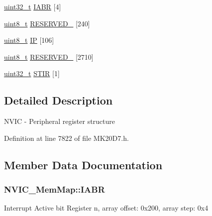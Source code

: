 \begin{DoxyCompactItemize}
\item 
\hyperlink{_p_e___types_8h_a33594304e786b158f3fb30289278f5af}{uint32\+\_\+t} \hyperlink{struct_n_v_i_c___mem_map_ab1d202f955863778a0b6bfc374e4a1f4}{I\+A\+BR} \mbox{[}4\mbox{]}
\item 
\hyperlink{_p_e___types_8h_aba7bc1797add20fe3efdf37ced1182c5}{uint8\+\_\+t} \hyperlink{struct_n_v_i_c___mem_map_ae257851689c6513dec25b0a236a36956}{R\+E\+S\+E\+R\+V\+E\+D\+\_} \mbox{[}240\mbox{]}
\item 
\hyperlink{_p_e___types_8h_aba7bc1797add20fe3efdf37ced1182c5}{uint8\+\_\+t} \hyperlink{struct_n_v_i_c___mem_map_a8b35c83a4683fabecb9bd8423640599f}{IP} \mbox{[}106\mbox{]}
\item 
\hyperlink{_p_e___types_8h_aba7bc1797add20fe3efdf37ced1182c5}{uint8\+\_\+t} \hyperlink{struct_n_v_i_c___mem_map_acd83ec9417bf8a918af0dbe4c543720b}{R\+E\+S\+E\+R\+V\+E\+D\+\_} \mbox{[}2710\mbox{]}
\item 
\hyperlink{_p_e___types_8h_a33594304e786b158f3fb30289278f5af}{uint32\+\_\+t} \hyperlink{struct_n_v_i_c___mem_map_a0d427d2c9851d4fb15dbee6fe4b35e60}{S\+T\+IR} \mbox{[}1\mbox{]}
\end{DoxyCompactItemize}


\subsection{Detailed Description}
N\+V\+IC -\/ Peripheral register structure 

Definition at line 7822 of file M\+K20\+D7.\+h.



\subsection{Member Data Documentation}
\subsubsection[{\texorpdfstring{I\+A\+BR}{IABR}}]{ N\+V\+I\+C\+\_\+\+Mem\+Map\+::\+I\+A\+BR}\hypertarget{struct_n_v_i_c___mem_map_ab1d202f955863778a0b6bfc374e4a1f4}{}\label{struct_n_v_i_c___mem_map_ab1d202f955863778a0b6bfc374e4a1f4}
Interrupt Active bit Register n, array offset\+: 0x200, array step\+: 0x4 

